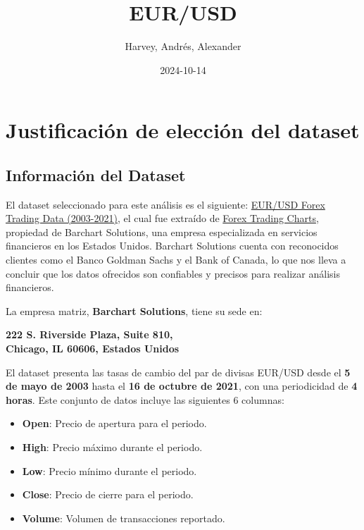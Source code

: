 \documentclass[
]{book}
\title{EUR/USD}
\author{Harvey, Andrés, Alexander}
\date{2024-10-14}
\providecommand{\tightlist}{%
  \setlength{\itemsep}{0pt}\setlength{\parskip}{0pt}}
\begin{document}
\maketitle

{
\setcounter{tocdepth}{1}
\tableofcontents
}
\chapter{Justificación de elección del dataset}\label{justificaciuxf3n-de-elecciuxf3n-del-dataset}

\section{Información del Dataset}\label{informaciuxf3n-del-dataset}

El dataset seleccionado para este análisis es el siguiente: \href{https://www.kaggle.com/datasets/chandrimad31/eurusd-forex-trading-data-20032021}{EUR/USD Forex Trading Data (2003-2021)}, el cual fue extraído de \href{https://forex.tradingcharts.com/}{Forex Trading Charts}, propiedad de Barchart Solutions, una empresa especializada en servicios financieros en los Estados Unidos. Barchart Solutions cuenta con reconocidos clientes como el Banco Goldman Sachs y el Bank of Canada, lo que nos lleva a concluir que los datos ofrecidos son confiables y precisos para realizar análisis financieros.

La empresa matriz, \textbf{Barchart Solutions}, tiene su sede en:

\textbf{222 S. Riverside Plaza, Suite 810,\\
Chicago, IL 60606, Estados Unidos}

El dataset presenta las tasas de cambio del par de divisas EUR/USD desde el \textbf{5 de mayo de 2003} hasta el \textbf{16 de octubre de 2021}, con una periodicidad de \textbf{4 horas}. Este conjunto de datos incluye las siguientes 6 columnas:

\begin{itemize}
\tightlist
\item
  \textbf{Open}: Precio de apertura para el periodo.
\item
  \textbf{High}: Precio máximo durante el periodo.
\item
  \textbf{Low}: Precio mínimo durante el periodo.
\item
  \textbf{Close}: Precio de cierre para el periodo.
\item
  \textbf{Volume}: Volumen de transacciones reportado.
\end{itemize}
\end{document}
